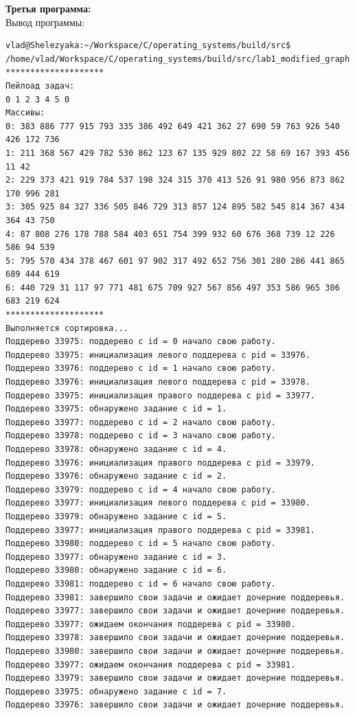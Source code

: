 \documentclass[a4paper,14pt]{extarticle}
\begin{document}
\textbf{Третья программа:}\\
Вывод программы:\\
\begin{verbatim}
vlad@Shelezyaka:~/Workspace/C/operating_systems/build/src$ /home/vlad/Workspace/C/operating_systems/build/src/lab1_modified_graph
********************
Пейлоад задач:
0 1 2 3 4 5 0 
Массивы:
0: 383 886 777 915 793 335 386 492 649 421 362 27 690 59 763 926 540 426 172 736 
1: 211 368 567 429 782 530 862 123 67 135 929 802 22 58 69 167 393 456 11 42 
2: 229 373 421 919 784 537 198 324 315 370 413 526 91 980 956 873 862 170 996 281 
3: 305 925 84 327 336 505 846 729 313 857 124 895 582 545 814 367 434 364 43 750 
4: 87 808 276 178 788 584 403 651 754 399 932 60 676 368 739 12 226 586 94 539 
5: 795 570 434 378 467 601 97 902 317 492 652 756 301 280 286 441 865 689 444 619 
6: 440 729 31 117 97 771 481 675 709 927 567 856 497 353 586 965 306 683 219 624 
********************
Выполняется сортировка...
Поддерево 33975: поддерево с id = 0 начало свою работу.
Поддерево 33975: инициализация левого поддерева с pid = 33976.
Поддерево 33976: поддерево с id = 1 начало свою работу.
Поддерево 33976: инициализация левого поддерева с pid = 33978.
Поддерево 33975: инициализация правого поддерева с pid = 33977.
Поддерево 33975: обнаружено задание с id = 1.
Поддерево 33977: поддерево с id = 2 начало свою работу.
Поддерево 33978: поддерево с id = 3 начало свою работу.
Поддерево 33978: обнаружено задание с id = 4.
Поддерево 33976: инициализация правого поддерева с pid = 33979.
Поддерево 33976: обнаружено задание с id = 2.
Поддерево 33979: поддерево с id = 4 начало свою работу.
Поддерево 33977: инициализация левого поддерева с pid = 33980.
Поддерево 33979: обнаружено задание с id = 5.
Поддерево 33977: инициализация правого поддерева с pid = 33981.
Поддерево 33980: поддерево с id = 5 начало свою работу.
Поддерево 33977: обнаружено задание с id = 3.
Поддерево 33980: обнаружено задание с id = 6.
Поддерево 33981: поддерево с id = 6 начало свою работу.
Поддерево 33981: завершило свои задачи и ожидает дочерние поддеревья.
Поддерево 33977: завершило свои задачи и ожидает дочерние поддеревья.
Поддерево 33977: ожидаем окончания поддерева с pid = 33980.
Поддерево 33978: завершило свои задачи и ожидает дочерние поддеревья.
Поддерево 33980: завершило свои задачи и ожидает дочерние поддеревья.
Поддерево 33977: ожидаем окончания поддерева с pid = 33981.
Поддерево 33979: завершило свои задачи и ожидает дочерние поддеревья.
Поддерево 33975: обнаружено задание с id = 7.
Поддерево 33976: завершило свои задачи и ожидает дочерние поддеревья.

\end{verbatim}
\end{document}
